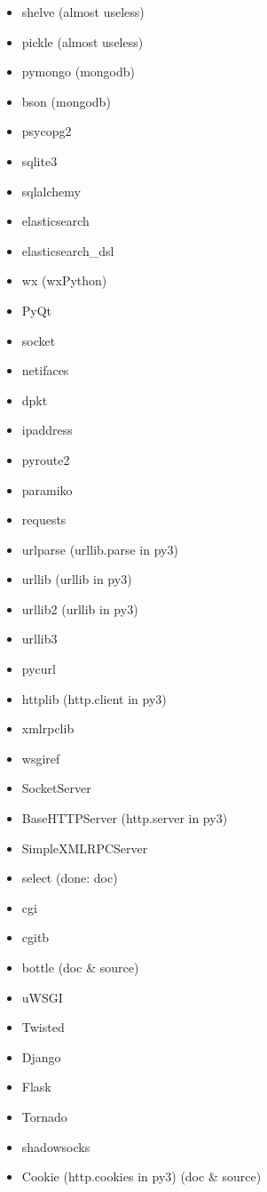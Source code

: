 \documentclass{article}
\begin{document}
\begin{enumerate}
\begin{itemize}
            \item shelve (almost useless)
            \item pickle (almost useless)
            \item pymongo (mongodb)
            \item bson (mongodb)
            \item psycopg2
            \item sqlite3
            \item sqlalchemy
            \item elasticsearch
            \item elasticsearch_dsl

            \item wx (wxPython)
            \item PyQt

            \item socket
            \item netifaces
            \item dpkt
            \item ipaddress
            \item pyroute2
            \item paramiko
            \item requests
            \item urlparse (urllib.parse in py3)
            \item urllib (urllib in py3)
            \item urllib2 (urllib in py3)
            \item urllib3
            \item pycurl
            \item httplib (http.client in py3)
            \item xmlrpclib
            \item wsgiref
            \item SocketServer
            \item BaseHTTPServer (http.server in py3)
            \item SimpleXMLRPCServer
            \item select (done: doc)
            \item cgi
            \item cgitb
            \item bottle (doc & source)
            \item uWSGI
            \item Twisted
            \item Django
            \item Flask
            \item Tornado
            \item shadowsocks
            \item Cookie (http.cookies in py3) (doc & source)


\end{itemize}
\end{enumerate}
\end{document}
